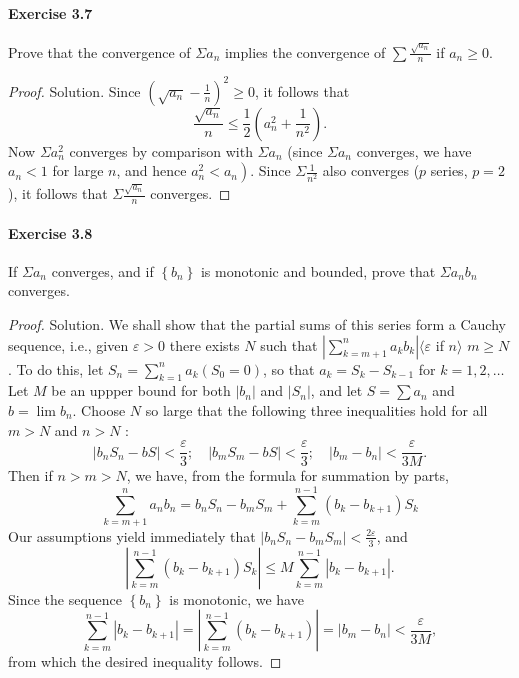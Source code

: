 \documentclass{article}
\theoremstyle{definition}
\begin{document}
\paragraph{Exercise 3.7} Prove that the convergence of $\Sigma a_{n}$ implies the convergence of $\sum \frac{\sqrt{a_{n}}}{n}$ if $a_n\geq 0$.
\begin{proof}
    Solution. Since $\left(\sqrt{a_n}-\frac{1}{n}\right)^2 \geq 0$, it follows that
$$
\frac{\sqrt{a_n}}{n} \leq \frac{1}{2}\left(a_n^2+\frac{1}{n^2}\right) .
$$
Now $\Sigma a_n^2$ converges by comparison with $\Sigma a_n$ (since $\Sigma a_n$ converges, we have $a_n<1$ for large $n$, and hence $\left.a_n^2<a_n\right)$. Since $\Sigma \frac{1}{n^2}$ also converges ($p$ series, $p=2$ ), it follows that $\Sigma \frac{\sqrt{a_n}}{n}$ converges.
\end{proof}


\paragraph{Exercise 3.8} If $\Sigma a_{n}$ converges, and if $\left\{b_{n}\right\}$ is monotonic and bounded, prove that $\Sigma a_{n} b_{n}$ converges.
\begin{proof}
    Solution. We shall show that the partial sums of this series form a Cauchy sequence, i.e., given $\varepsilon>0$ there exists $N$ such that $\left|\sum_{k=m+1}^n a_k b_k\right|\langle\varepsilon$ if $n\rangle$ $m \geq N$. To do this, let $S_n=\sum_{k=1}^n a_k\left(S_0=0\right)$, so that $a_k=S_k-S_{k-1}$ for $k=1,2, \ldots$ Let $M$ be an uppper bound for both $\left|b_n\right|$ and $\left|S_n\right|$, and let $S=\sum a_n$ and $b=\lim b_n$. Choose $N$ so large that the following three inequalities hold for all $m>N$ and $n>N$ :
$$
\left|b_n S_n-b S\right|<\frac{\varepsilon}{3} ; \quad\left|b_m S_m-b S\right|<\frac{\varepsilon}{3} ; \quad\left|b_m-b_n\right|<\frac{\varepsilon}{3 M} .
$$
Then if $n>m>N$, we have, from the formula for summation by parts,
$$
\sum_{k=m+1}^n a_n b_n=b_n S_n-b_m S_m+\sum_{k=m}^{n-1}\left(b_k-b_{k+1}\right) S_k
$$
Our assumptions yield immediately that $\left|b_n S_n-b_m S_m\right|<\frac{2 \varepsilon}{3}$, and
$$
\left|\sum_{k=m}^{n-1}\left(b_k-b_{k+1}\right) S_k\right| \leq M \sum_{k=m}^{n-1}\left|b_k-b_{k+1}\right| .
$$
Since the sequence $\left\{b_n\right\}$ is monotonic, we have
$$
\sum_{k=m}^{n-1}\left|b_k-b_{k+1}\right|=\left|\sum_{k=m}^{n-1}\left(b_k-b_{k+1}\right)\right|=\left|b_m-b_n\right|<\frac{\varepsilon}{3 M},
$$
from which the desired inequality follows.
\end{proof}
\end{document}

